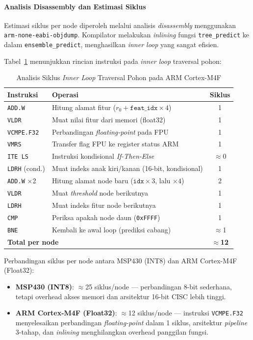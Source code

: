 \paragraph{Analisis Disassembly dan Estimasi Siklus}
Estimasi siklus per node diperoleh melalui analisis \textit{disassembly} menggunakan \texttt{arm-none-eabi-objdump}. Kompilator melakukan \textit{inlining} fungsi \texttt{tree\_predict} ke dalam \texttt{ensemble\_predict}, menghasilkan \textit{inner loop} yang sangat efisien.

Tabel~\ref{tab:arm_cycles} menunjukkan rincian instruksi pada \textit{inner loop} traversal pohon:

\begin{table}[htbp]
\centering
\caption{Analisis Siklus \textit{Inner Loop} Traversal Pohon pada ARM Cortex-M4F}
\label{tab:arm_cycles}
\begin{tabular}{llc}
\hline
\textbf{Instruksi} & \textbf{Operasi} & \textbf{Siklus} \\
\hline
\texttt{ADD.W} & Hitung alamat fitur ($r_0 + \texttt{feat\_idx} \times 4$) & 1 \\
\texttt{VLDR} & Muat nilai fitur dari memori (float32) & 1 \\
\texttt{VCMPE.F32} & Perbandingan \textit{floating-point} pada FPU & 1 \\
\texttt{VMRS} & Transfer flag FPU ke register status ARM & 1 \\
\texttt{ITE LS} & Instruksi kondisional \textit{If-Then-Else} & $\approx$0 \\
\texttt{LDRH} (cond.) & Muat indeks anak kiri/kanan (16-bit, kondisional) & 1 \\
\texttt{ADD.W} $\times$2 & Hitung alamat node baru ($\texttt{idx} \times 3$, lalu $\times 4$) & 2 \\
\texttt{VLDR} & Muat \textit{threshold} node berikutnya & 1 \\
\texttt{LDRH} & Muat indeks fitur node berikutnya & 1 \\
\texttt{CMP} & Periksa apakah node daun (\texttt{0xFFFF}) & 1 \\
\texttt{BNE} & Kembali ke awal loop (prediksi cabang) & $\approx$1 \\
\hline
\multicolumn{2}{l}{\textbf{Total per node}} & \textbf{$\approx$12} \\
\hline
\end{tabular}
\end{table}

Perbandingan siklus per node antara MSP430 (INT8) dan ARM Cortex-M4F (Float32):
\begin{itemize}
    \item \textbf{MSP430 (INT8)}: $\approx$25 siklus/node --- perbandingan 8-bit sederhana, tetapi overhead akses memori dan arsitektur 16-bit CISC lebih tinggi.
    \item \textbf{ARM Cortex-M4F (Float32)}: $\approx$12 siklus/node --- instruksi \texttt{VCMPE.F32} menyelesaikan perbandingan \textit{floating-point} dalam 1 siklus, arsitektur \textit{pipeline} 3-tahap, dan \textit{inlining} menghilangkan overhead panggilan fungsi.
\end{itemize}

